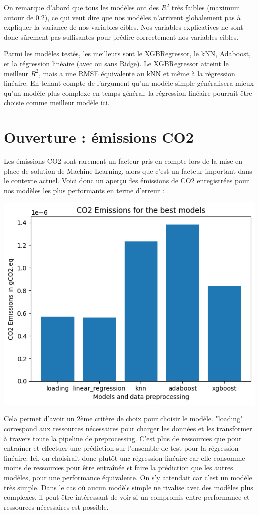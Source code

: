 \documentclass{article}
\begin{document}
\bigskip
On remarque d'abord que tous les modèles ont des $R^2$ très faibles (maximum autour de 0.2), ce qui veut dire que nos modèles n'arrivent globalement pas à expliquer la variance de nos variables cibles. Nos variables explicatives ne sont donc sûrement pas suffisantes pour prédire correctement nos variables cibles.

Parmi les modèles testés, les meilleurs sont le XGBRegressor, le kNN, Adaboost, et la régression linéaire (avec ou sans Ridge). Le XGBRegressor atteint le meilleur $R^2$, mais a une RMSE équivalente au kNN et même à la régression linéaire. En tenant compte de l'argument qu'un modèle simple généralisera mieux qu'un modèle plus complexe en temps général, la régression linéaire pourrait être choisie comme meilleur modèle ici.




\section{Ouverture : émissions CO2}
Les émissions CO2 sont rarement un facteur pris en compte lors de la mise en place de solution de Machine Learning, alors que c'est un facteur important dans le contexte actuel. Voici donc un aperçu des émissions de CO2 enregistrées pour nos modèles les plus performants en terme d'erreur :

\begin{center}
\includegraphics[width=15cm]{CO2_emissions.png}
\end{center}

Cela permet d'avoir un 2ème critère de choix pour choisir le modèle. "loading" correspond aux ressources nécessaires pour charger les données et les transformer à travers toute la pipeline de preprocessing. C'est plus de ressources que pour entraîner et effectuer une prédiction sur l'ensemble de test pour la régression linéaire.
Ici, on choisirait donc plutôt une régression linéaire car elle consomme moins de ressources pour être entraînée et faire la prédiction que les autres modèles, pour une performance équivalente. On s'y attendait car c'est un modèle très simple. Dans le cas où aucun modèle simple ne rivalise avec des modèles plus complexes, il peut être intéressant de voir si un compromis entre performance et ressources nécessaires est possible.
\end{document}
